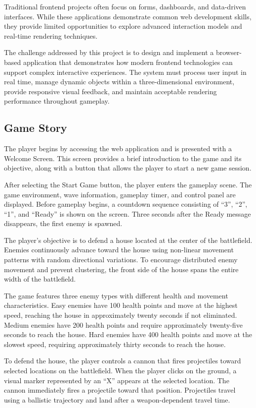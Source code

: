\documentclass[11pt,a4paper]{article}
\begin{document}
Traditional frontend projects often focus on forms, dashboards, and data-driven
interfaces. While these applications demonstrate common web development skills,
they provide limited opportunities to explore advanced interaction models and
real-time rendering techniques.

The challenge addressed by this project is to design and implement a
browser-based application that demonstrates how modern frontend technologies can
support complex interactive experiences. The system must process user input in
real time, manage dynamic objects within a three-dimensional environment,
provide responsive visual feedback, and maintain acceptable rendering
performance throughout gameplay.

\subsection{Game Story}

The player begins by accessing the web application and is presented with a
Welcome Screen. This screen provides a brief introduction to the game and its
objective, along with a button that allows the player to start a new game
session.

After selecting the Start Game button, the player enters the gameplay scene. The
game environment, wave information, gameplay timer, and control panel are
displayed. Before gameplay begins, a countdown sequence consisting of ``3'',
``2'', ``1'', and ``Ready'' is shown on the screen. Three seconds after the
Ready message disappears, the first enemy is spawned.

The player's objective is to defend a house located at the center of the
battlefield. Enemies continuously advance toward the house using non-linear
movement patterns with random directional variations. To encourage distributed
enemy movement and prevent clustering, the front side of the house spans the
entire width of the battlefield.

The game features three enemy types with different health and movement
characteristics. Easy enemies have 100 health points and move at the highest
speed, reaching the house in approximately twenty seconds if not eliminated.
Medium enemies have 200 health points and require approximately twenty-five
seconds to reach the house. Hard enemies have 400 health points and move at the
slowest speed, requiring approximately thirty seconds to reach the house.

To defend the house, the player controls a cannon that fires projectiles toward
selected locations on the battlefield. When the player clicks on the ground, a
visual marker represented by an ``X'' appears at the selected location. The
cannon immediately fires a projectile toward that position. Projectiles travel
using a ballistic trajectory and land after a weapon-dependent travel time.
\end{document}
